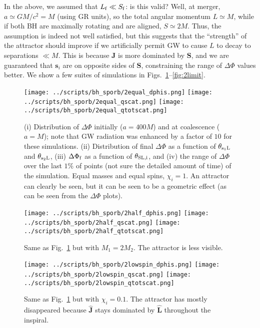 \documentclass[11pt,
        usenames, %
        dvipsnames %
    ]{article}
\newcommand*{\bm}[1]{\boldsymbol{\mathbf{#1}}}
\newcommand*{\uv}[1]{\hat{\bm{#1}}}
\begin{document}
In the above, we assumed that $L_{\rm f} \ll S_{\rm f}$: is this valid? Well, at
merger, $a \simeq GM/c^2 = M$ (using GR units), so the total angular momentum $L
\simeq M$, while if both BH are maximally rotating and are aligned, $S \simeq
2M$. Thus, the assumption is indeed not well satisfied, but this suggests that
the ``strength'' of the attractor should improve if we artificially permit GW to
cause $L$ to decay to separations $\ll M$. This is because $\bm{J}$ is more
dominated by $\bm{S}$, and we are guaranteed that $\bm{s}_i$ are on opposite
sides of $\bm{S}$, constraining the range of $\Delta \Phi$ values better. We
show a few suites of simulations in Figs.~\ref{fig:2equal}--\ref{fig:2limit}.
\begin{figure}
    \centering
    \texttt{[image: ../scripts/bh\_sporb/2equal\_dphis.png]}
    \texttt{[image: ../scripts/bh\_sporb/2equal\_qscat.png]}
    \texttt{[image: ../scripts/bh\_sporb/2equal\_qtotscat.png]}
    \caption{(i) Distribution of $\Delta \Phi$ initially ($a = 400 M$) and at
    coalescence ($a = M$); note that GW radiation was enhanced by a factor of
    $10$ for these simulations. (ii) Distribution of final $\Delta \Phi$ as a
    function of $\theta_{\rm s_1L}$ and $\theta_{\rm s_2L}$, (iii) $\Delta
    \Phi_{\rm f}$ as a function of $\theta_{\rm SL, i}$, and (iv) the range of
    $\Delta \Phi$ over the last $1\%$ of points (not sure the detailed amount of
    time) of the simulation. Equal masses and equal spins, $\chi_i = 1$. An
    attractor can clearly be seen, but it can be seen to be a geometric effect
    (as can be seen from the $\Delta \Phi$ plots).}\label{fig:2equal}
\end{figure}
\begin{figure}
    \centering
    \texttt{[image: ../scripts/bh\_sporb/2half\_dphis.png]}
    \texttt{[image: ../scripts/bh\_sporb/2half\_qscat.png]}
    \texttt{[image: ../scripts/bh\_sporb/2half\_qtotscat.png]}
    \caption{Same as Fig.~\ref{fig:2equal} but with $M_1 = 2M_2$. The attractor
    is less visible.}\label{fig:2half}
\end{figure}
\begin{figure}
    \centering
    \texttt{[image: ../scripts/bh\_sporb/2lowspin\_dphis.png]}
    \texttt{[image: ../scripts/bh\_sporb/2lowspin\_qscat.png]}
    \texttt{[image: ../scripts/bh\_sporb/2lowspin\_qtotscat.png]}
    \caption{Same as Fig.~\ref{fig:2equal} but with $\chi_i =
    0.1$. The attractor has mostly disappeared because $\uv{J}$ stays dominated
    by $\uv{L}$ throughout the inspiral.}\label{fig:2lowspin}
\end{figure}
\end{document}

